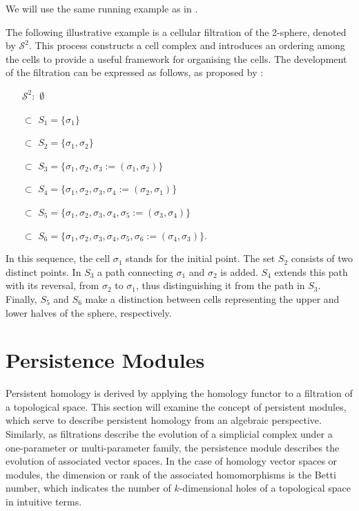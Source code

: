 We will use the same running example as in \cite[\S 2.2]{de2011dualities}.

\begin{example}
	\label{filteredsphere}
	The following illustrative example is a cellular filtration of the 2-sphere, denoted by $\mathcal{S}^{2}$. This process constructs a cell complex and introduces an ordering among the cells to provide a useful framework for organising the cells. The development of the filtration can be expressed as follows, as proposed by \cite[\S 2.2]{de2011dualities}:
	\begin{itemize}
		\item[$\mathcal{S}^{2}:$] $\emptyset$
		\item[$\subset$] $S_{1} = \{\sigma_{1}\}$
		\item[$\subset$] $S_{2} = \{\sigma_{1}, \sigma_{2}\}$
		\item[$\subset$] $S_{3} = \{\sigma_{1}, \sigma_{2}, \sigma_{3} := (\sigma_{1}, \sigma_{2})\}$
		\item[$\subset$] $S_{4} = \{\sigma_{1}, \sigma_{2}, \sigma_{3}, \sigma_{4} := (\sigma_{2}, \sigma_{1})\}$
		\item[$\subset$] $S_{5} = \{\sigma_{1}, \sigma_{2}, \sigma_{3}, \sigma_{4}, \sigma_{5} := (\sigma_{3}, \sigma_{4})\}$
		\item[$\subset$] $S_{6} = \{\sigma_{1}, \sigma_{2}, \sigma_{3}, \sigma_{4}, \sigma_{5}, \sigma_{6} := (\sigma_{4}, \sigma_{3})\}.$
	\end{itemize}
	In this sequence, the cell $\sigma_{1}$ stands for the initial point. The set $S_{2}$ consists of two distinct points. In $S_{3}$ a path connecting $\sigma_{1}$ and $\sigma_{2}$ is added. $S_{4}$ extends this path with its reversal, from $\sigma_{2}$ to $\sigma_{1}$, thus distinguishing it from the path in $S_{3}$. Finally, $S_{5}$ and $S_{6}$ make a distinction between cells representing the upper and lower halves of the sphere, respectively.
\end{example}

\section{Persistence Modules}
\label{PersistenceModules}
Persistent homology is derived by applying the homology functor to a filtration of a topological space. This section will examine the concept of persistent modules, which serve to describe persistent homology from an algebraic perspective. Similarly, as filtrations describe the evolution of a simplicial complex under a one-parameter or multi-parameter family, the persistence module describes the evolution of associated vector spaces. In the case of homology vector spaces or modules, the dimension or rank of the associated homomorphisms is the Betti number, which indicates the number of $k$-dimensional holes of a topological space in intuitive terms.

